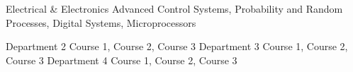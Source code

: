 \begin{cvskills}

    \cvskill
    {Electrical \& Electronics} %
    {Advanced Control Systems, Probability and Random Processes, Digital Systems, Microprocessors} %

    \cvskill
    {Department 2} %
    {Course 1, Course 2, Course 3} %
    \cvskill
    {Department 3} %
    {Course 1, Course 2, Course 3} %
    \cvskill
    {Department 4} %
    {Course 1, Course 2, Course 3} %
    

\end{cvskills}

